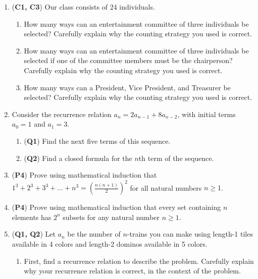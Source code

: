 \documentclass[12pt]{article}
\begin{document}
\begin{enumerate}
\begin{enumerate}[(a)]
\end{enumerate}

\item (\textbf{C1, C3}) Our class consists of 24 individuals. 
\begin{enumerate}
    \item How many ways can an entertainment committee of three individuals be selected? Carefully explain why the counting strategy you used is correct.
    
    \item How many ways can an entertainment committee of three individuals be selected if one of the committee members must be the chairperson? Carefully explain why the counting strategy you used is correct.
    
    \item How many ways can a President, Vice President, and Treasurer be selected? Carefully explain why the counting strategy you used is correct.
    
 \end{enumerate}

\item Consider the recurrence relation $a_n = 2a_{n-1} + 8a_{n-2}$, with initial terms $a_0 = 1$ and $a_1 = 3$. 
\begin{enumerate}
    \item (\textbf{Q1}) Find the next five terms of this sequence.
    
    \item (\textbf{Q2}) Find a closed formula for the $n$th term of the sequence.
    
\end{enumerate}


\item (\textbf{P4}) Prove using mathematical induction that $1^3 + 2^3 + 3^3 + \ldots + n^3 = \left(\frac{n(n+1)}{2}\right)^2$ for all natural numbers $n \geq 1$.


\item (\textbf{P4}) Prove using mathematical induction that every set containing $n$ elements has $2^n$ subsets for any natural number $n \geq 1$.


\item (\textbf{Q1, Q2}) Let $a_n$ be the number of $n$-trains you can make using length-1 tiles available in 4 colors and length-2 dominos available in 5 colors.
\begin{enumerate}
    \item First, find a recurrence relation to describe the problem. Carefully explain why your recurrence relation is correct, in the context of the problem.
    

\end{enumerate}
\end{enumerate}
\end{document}

